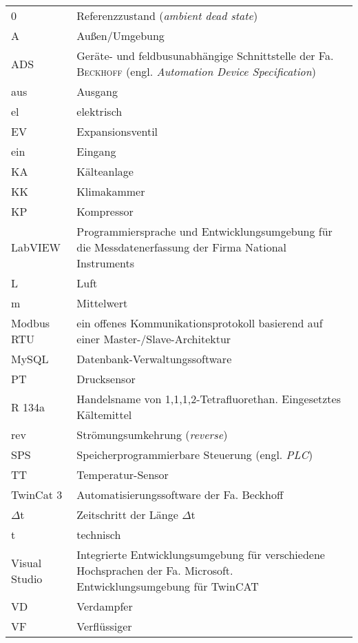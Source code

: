 \begin{onehalfspacing}
\begin{longtable}[h]{p{} p{}}
		0 & Referenzzustand (\emph{ambient dead state})\\
		A & Außen/Umgebung\\ 	
		ADS &  Geräte- und feldbusunabhängige Schnittstelle der Fa. \textsc{Beckhoff} (engl. \textit{Automation Device Specification}) \\
		aus & Ausgang\\	
		el & elektrisch \\
		EV & Expansionsventil\\
		ein & Eingang \\
		KA & Kälteanlage \\
		KK & Klimakammer\\
		KP & Kompressor\\
		LabVIEW & Programmiersprache und Entwicklungsumgebung für die Messdatenerfassung der Firma National Instruments\\
		L & Luft\\
		m & Mittelwert\\
		Modbus RTU & ein offenes Kommunikationsprotokoll basierend auf einer Master-/Slave-Architektur \\
		MySQL & Datenbank-Verwaltungssoftware \\
		PT & Drucksensor\\
		R 134a & Handelsname von 1,1,1,2-Tetrafluorethan. Eingesetztes Kältemittel\\ 
		rev & Strömungsumkehrung (\emph{reverse})\\
		SPS & Speicherprogrammierbare Steuerung (engl. \textit{PLC}) \\
		TT & Temperatur-Sensor\\
		TwinCat 3& Automatisierungssoftware der Fa. Beckhoff\\
		$\Delta$t & Zeitschritt der Länge $\Delta$t\\
		t & technisch\\
		Visual Studio & Integrierte Entwicklungsumgebung für verschiedene Hochsprachen der Fa. Microsoft. Entwicklungsumgebung für TwinCAT\\
		VD & Verdampfer \\
		VF & Verflüssiger \\

		
\end{longtable}
\end{onehalfspacing}
